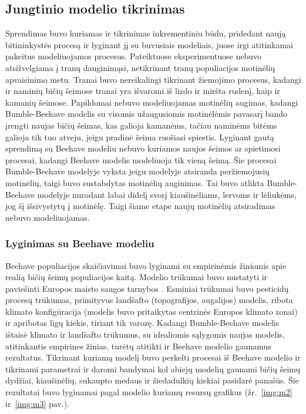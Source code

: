 \documentclass{VUMIFPSmagistrinis}
\begin{document}
\subsection{Jungtinio modelio tikrinimas}
Sprendimas buvo kuriamas ir tikrinimas inkrementiniu būdu, pridedant naują bitininkystės procesą ir lyginant jį su buvusiais modeliais, juose irgi atitinkamai pakeitus modeliuojamos procesus.
Pateiktuose eksperimentuose nebuvo atsižvelgiama į tranų dauginimąsi, netikrinant tranų populiacijos motinėlių apvaisinimo metu. Tranai buvo nereikalingi tikrinant žiemojimo procesus, kadangi ir naminių bičių šeimose tranai yra išvaromi iš lizdo ir miršta rudenį, kaip ir kamanių šeimose. Papildomai nebuvo modeliuojamas motinėlių augimas, kadangi Bumble-Beehave modelis su visomis užaugusiomis motinėlėmis pavasarį bando įrengti naujas bičių šeimas, kas galioja kamanėms, tačiau naminėms bitėms galioja tik tuo atveju, jeigu pradinė šeima ruošiasi spiestis. Lyginant gautą sprendimą su Beehave modeliu nebuvo kuriamos naujos šeimos ar spietimosi procesai, kadangi Beehave modelis modeliuoja tik vieną šeimą. Šie procesai Bumble-Beehave modelyje vyksta jeigu modelyje atsiranda peržiemojusių motinėlių, taigi buvo sustabdytas motinėlių auginimas. Tai buvo atlikta Bumble-Beehave modelyje nurodant labai didelį svorį kiaušinėliams, lervoms ir  lėliukėms, jog šį išsivystytų į motinėlę. Taigi šiame etape naujų motinėlių atsiradimas nebuvo modeliuojamas.


\subsubsection{Lyginimas su Beehave modeliu}
Beehave populiacijos skaičiavimai buvo lyginami su empirinėmis žiniomis apie realią bičių šeimų populiacijos kaitą. Modelio trūkumai buvo nustatyti ir paviešinti Europos maisto saugos tarnybos \cite{EFSA15}. Esminiai trūkumai buvo pesticidų procesų trūkumas, primityvus landšafto (topografijos, augalijos) modelis, ribota klimato konfigūracija (modelis buvo pritaikytas centrinės Europos klimato zonai) ir apribotas ligų kiekis, tiriant tik varozę. Kadangi 	Bumble-Beehave modelis ištaisė klimato ir landšafto trūkumus, su idealiomis sąlygomis naujas modelis, atitinkantis empirines žinias, turėtų atitikti ir Beehave modelio gaunamus rezultatus.
Tikrinant kuriamą modelį buvo perkelti procesai iš Beehave modelio ir tikrinami parametrai ir daromi bandymai kol abiejų modelių gaunami bičių šeimų dydžiai, kiaušinėlių, sukaupto medaus ir žiedadulkių kiekiai pasidarė panašūs. Šie rezultatai buvo lyginamai pagal modelio kuriamų resursų grafikus (žr.~\ref{img:m2} ir~\ref{img:m3} pav.).
\end{document}

